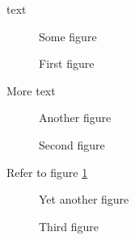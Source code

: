 \documentclass{article}
\begin{document}
text
\begin{figure}
Some figure
\caption{First figure}
\end{figure}
More text
\begin{figure}
Another figure
\caption{Second figure}
\label{fig}
\end{figure}
Refer to figure \ref{fig}
\begin{figure}
Yet another figure
\caption{Third figure}
\end{figure}
\end{document}
